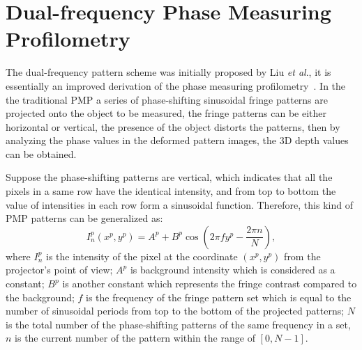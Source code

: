 \documentclass[]{spie}  %
\begin{document}
\section{Dual-frequency Phase Measuring Profilometry}
The dual-frequency pattern scheme was initially proposed by Liu \textit{et al}.\cite{liuk10}, it is essentially  an improved derivation of the phase measuring profilometry~\cite{hali89}. In the the traditional PMP a series of phase-shifting sinusoidal fringe patterns are projected onto the object to be measured, the fringe patterns can be either horizontal or vertical, the presence of the object distorts the patterns, then by analyzing the phase values in the deformed pattern images, the 3D depth values can be obtained.

Suppose the phase-shifting patterns are vertical, which indicates that all the pixels in a same row have the identical intensity, and from top to bottom the value of intensities in each row form a sinusoidal function. Therefore, this kind of PMP patterns can be generalized as:
 \begin{equation} \label{eq:1.1}
  	I^p_n(x^p, y^p) = A^p + B^p\cos\left(2\pi f y^p - \frac{2\pi n}{N}\right),
  \end{equation}
where $I^p_n$ is the intensity of the pixel at the coordinate $(x^p, y^p)$ from the projector's point of view; $A^p$ is background intensity which is considered as a constant; $B^p$ is another constant which represents the fringe contrast compared to the background; $f$ is the frequency of the fringe pattern set which is equal to the number of sinusoidal periods from top to the bottom of the projected patterns; $N$ is the total number of the phase-shifting patterns of the same frequency in a set, $n$ is the current number of the pattern within the range of $[0, N-1]$.
\end{document}
